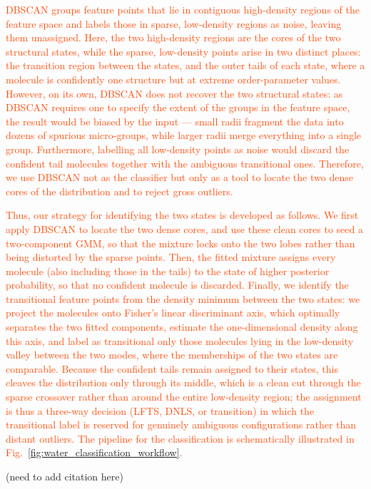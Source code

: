 \documentclass[aps, amsmath,amssymb, reprint, twocolumn, superscriptaddress]{revtex4-2}
\newcommand{\edit}[1]{\textcolor{OrangeRed}{#1}}
\begin{document}
\edit{DBSCAN groups feature points that lie in contiguous high-density regions of the feature space and labels those in sparse, low-density regions as noise, leaving them unassigned. Here, the two high-density regions are the cores of the two structural states, while the sparse, low-density points arise in two distinct places: the transition region between the states, and the outer tails of each state, where a molecule is confidently one structure but at extreme order-parameter values. However, on its own, DBSCAN does not recover the two structural states: as DBSCAN requires one to specify the extent of the groups in the feature space, the result would be biased by the input — small radii fragment the data into dozens of spurious micro-groups, while larger radii merge everything into a single group. Furthermore, labelling all low-density points as noise would discard the confident tail molecules together with the ambiguous transitional ones. Therefore, we use DBSCAN not as the classifier but only as a tool to locate the two dense cores of the distribution and to reject gross outliers.

Thus, our strategy for identifying the two states is developed as follows. We first apply DBSCAN to locate the two dense cores, and use these clean cores to seed a two-component GMM, so that the mixture locks onto the two lobes rather than being distorted by the sparse points. Then, the fitted mixture assigns every molecule (also including those in the tails) to the state of higher posterior probability, so that no confident molecule is discarded. Finally, we identify the transitional feature points from the density minimum between the two states: we project the molecules onto Fisher's linear discriminant axis, which optimally separates the two fitted components, estimate the one-dimensional density along this axis, and label as transitional only those molecules lying in the low-density valley between the two modes, where the memberships of the two states are comparable. Because the confident tails remain assigned to their states, this cleaves the distribution only through its middle, which is a clean cut through the sparse crossover rather than around the entire low-density region; the assignment is thus a three-way decision (LFTS, DNLS, or transition) in which the transitional label is reserved for genuinely ambiguous configurations rather than distant outliers. The pipeline for the classification is schematically illustrated in Fig.~\ref{fig:water_classification_workflow}.  } (need to add citation here) 
\end{document}
